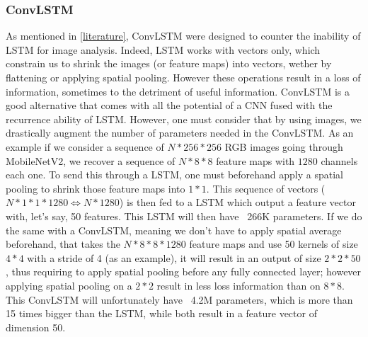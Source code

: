\documentclass[12pt, a4paper]{report}
\begin{document}
				\subsubsection{ConvLSTM}
					As mentioned in \ref{literature}, ConvLSTM were designed to counter the inability of LSTM for image analysis.
					Indeed, LSTM works with vectors only, which constrain us to shrink the images (or feature maps) into vectors, wether by flattening or applying spatial pooling.
					However these operations result in a loss of information, sometimes to the detriment of useful information.
					ConvLSTM is a good alternative that comes with all the potential of a CNN fused with the recurrence ability of LSTM.
					However, one must consider that by using images, we drastically augment the number of parameters needed in the ConvLSTM.
					As an example if we consider a sequence of $N*256*256$ RGB images going through MobileNetV2, we recover a sequence of $N*8*8$ feature maps with $1280$ channels each one.
					To send this through a LSTM, one must beforehand apply a spatial pooling to shrink those feature maps into $1*1$.
					This sequence of vectors ($N*1*1*1280 \Leftrightarrow N*1280$) is then fed to a LSTM which output a feature vector with, let's say, 50 features.
					This LSTM will then have ~266K parameters.
					If we do the same with a ConvLSTM, meaning we don't have to apply spatial average beforehand, that takes the $N*8*8*1280$ feature maps and use 50 kernels of size $4*4$ with a stride of 4 (as an example), it will result in an output of size $2*2*50$, thus requiring to apply spatial pooling before any fully connected layer; however applying spatial pooling on a $2*2$ result in less loss information than on $8*8$.
					This ConvLSTM will unfortunately have ~4.2M parameters, which is more than 15 times bigger than the LSTM, while both result in a feature vector of dimension 50.
\end{document}
